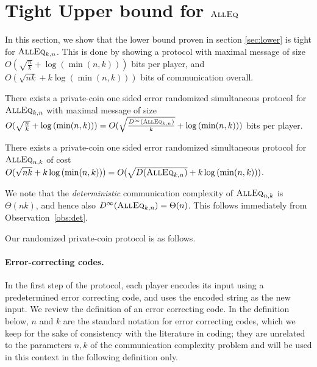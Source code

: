 	
	
	\section{Tight Upper bound for $\text{\textsc{AllEq}}$}
	\label{sec:upper}
	In this section, we show that the lower bound proven in section \ref{sec:lower} is tight for $\text{\textsc{AllEq}}_{k,n}$. This is done by showing a protocol with maximal message of size $O(\sqrt{\frac{n}{k}}+\log{(\min(n,k))})$ bits per player, and $O(\sqrt{nk}+k\log{(\min(n,k))})$ bits of communication overall. 
	
	\begin{theorem}
		\label{upperBoundMain}
		There exists a private-coin one sided error randomized simultaneous protocol for $\text{\textsc{AllEq}}_{k,n}$ with maximal message of size $O(\sqrt{\frac{n}{k}}+\log{(\min(n,k))}) = O(\sqrt{\frac{D^\infty(\text{\textsc{AllEq}}_{k,n})}{k}} + \log{(\min(n,k))})$ bits per player.
	\end{theorem}	
	\begin{corollary}
		There exists a private-coin one sided error randomized simultaneous protocol for $\text{\textsc{AllEq}}_{n,k}$ of cost  $O(\sqrt{nk}+k\log{(\min(n,k))})= O(\sqrt{D(\text{\textsc{AllEq}}_{k,n})} + k\log{(\min(n,k))})$.
	\end{corollary}

	We note that the \emph{deterministic} communication complexity of $\text{\textsc{AllEq}}_{n,k}$ is $\Theta(nk)$, and hence also $D^\infty(\text{\textsc{AllEq}}_{k,n})=\Theta(n)$. This follows immediately from Observation~\ref{obs:det}.
	
	Our randomized private-coin protocol is as follows.
	\paragraph{Error-correcting codes.}
		In the first step of the protocol, each player encodes its input using a predetermined error correcting code, and uses the encoded string as the new input.
		We review the definition of an error correcting code. In the definition below, $n$ and $k$ are the standard notation for error correcting codes, which we keep for the sake of consistency with the literature in coding; they are unrelated to the parameters $n,k$ of the communication complexity problem and will be used in this context in the following definition only.
		
